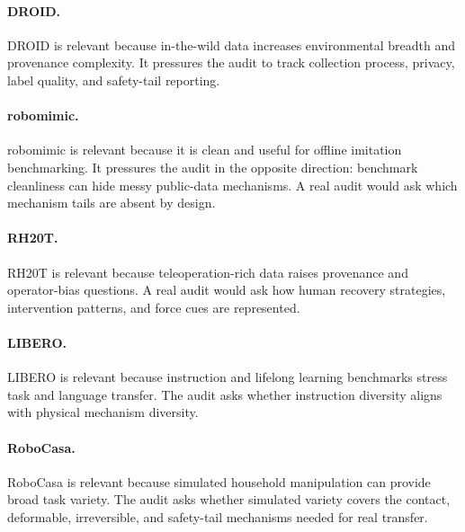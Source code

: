 \documentclass{article}
\begin{document}
\paragraph{DROID.}
DROID is relevant because in-the-wild data increases environmental breadth and provenance complexity. It pressures the audit to track collection process, privacy, label quality, and safety-tail reporting.

\paragraph{robomimic.}
robomimic is relevant because it is clean and useful for offline imitation benchmarking. It pressures the audit in the opposite direction: benchmark cleanliness can hide messy public-data mechanisms. A real audit would ask which mechanism tails are absent by design.

\paragraph{RH20T.}
RH20T is relevant because teleoperation-rich data raises provenance and operator-bias questions. A real audit would ask how human recovery strategies, intervention patterns, and force cues are represented.

\paragraph{LIBERO.}
LIBERO is relevant because instruction and lifelong learning benchmarks stress task and language transfer. The audit asks whether instruction diversity aligns with physical mechanism diversity.

\paragraph{RoboCasa.}
RoboCasa is relevant because simulated household manipulation can provide broad task variety. The audit asks whether simulated variety covers the contact, deformable, irreversible, and safety-tail mechanisms needed for real transfer.
\end{document}
